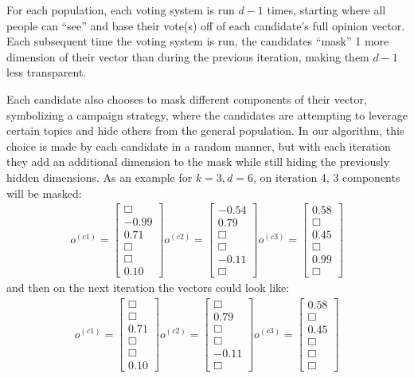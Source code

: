 For each population, each voting system is run $d-1$ times, starting where all people can ``see'' and base their vote(s) off of each candidate's full opinion vector.
Each subsequent time the voting system is run, the candidates ``mask'' 1 more dimension of their vector than during the previous iteration, making them $d-1$ less transparent.

Each candidate also chooses to mask different components of their vector, symbolizing a campaign strategy, where the candidates are attempting to leverage certain topics and hide others from the general population.
In our algorithm, this choice is made by each candidate in a random manner, but with each iteration they add an additional dimension to the mask while still hiding the previously hidden dimensions.
As an example for $k = 3, d = 6$, on iteration 4, 3 components will be masked:
\begin{align*}
o^{(c1)} = \begin{bmatrix}\Box \\ -0.99 \\ 0.71 \\ \Box \\ \Box \\ 0.10  \end{bmatrix}
o^{(c2)} = \begin{bmatrix}-0.54 \\ 0.79 \\ \Box \\ \Box \\ -0.11\\ \Box  \end{bmatrix}
o^{(c3)} = \begin{bmatrix}0.58 \\ \Box \\ 0.45 \\ \Box \\ 0.99 \\ \Box  \end{bmatrix}
\end{align*}
and then on the next iteration the vectors could look like:
\begin{align*}
o^{(c1)} = \begin{bmatrix}\Box \\ \Box \\ 0.71 \\ \Box \\ \Box \\ 0.10  \end{bmatrix}
o^{(c2)} = \begin{bmatrix}\Box \\ 0.79 \\ \Box \\ \Box \\ -0.11\\ \Box  \end{bmatrix}
o^{(c3)} = \begin{bmatrix}0.58 \\ \Box \\ 0.45 \\ \Box \\ \Box \\ \Box  \end{bmatrix}
\end{align*}
